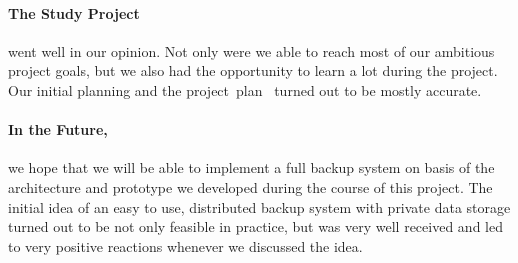 \paragraph{The Study Project}
went well in our opinion. Not only were we able to reach most of our ambitious project goals, but we also had the opportunity to learn a lot during the project. Our initial planning and the project~plan~\cite{project-plan} turned out to be mostly accurate.

\paragraph{In the Future,}
we hope that we will be able to implement a full backup system on basis of the architecture and prototype we developed during the course of this project. The initial idea of an easy to use, distributed backup system with private data storage turned out to be not only feasible in practice, but was very well received and led to very positive reactions whenever we discussed the idea.